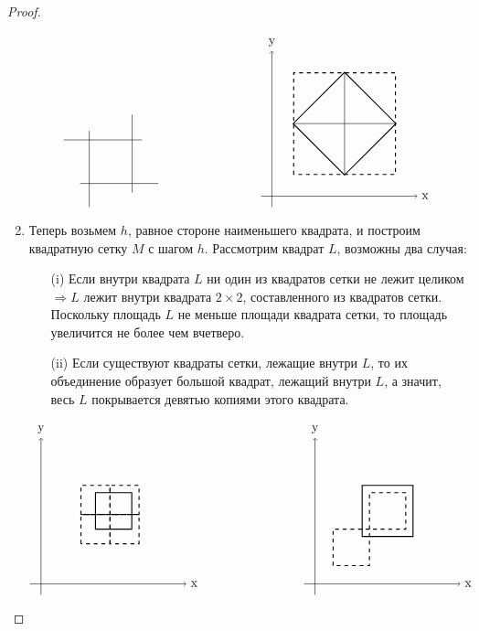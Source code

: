 \begin{proof}
\begin{enumerate}
\[\begin{tikzpicture}
            \draw[-] (0.7, 2.6) -- (2.85, 2.6);
            \draw[-] (1.15, 1.4) -- (3.3, 1.4);
            \draw[-] (1.4, 0.75) -- (1.4, 2.85);
            \draw[-] (2.58, 1.15) -- (2.58, 3.3);
        \end{tikzpicture}
        \tab[80pt]
        \begin{tikzpicture}
            \draw[->] (-0.3, 0) -- (4, 0) node[right] {x};
            \draw[->] (0, -0.3) -- (0, 4) node[above] {y};
            \draw[thick, rotate around={45:(2,2)}] (1, 1) rectangle (3, 3);
            \draw[thick, dashed] (0.6, 0.6) rectangle (3.4, 3.4);
            \draw[-] (2, 0.6) -- (2, 3.4);
            \draw[-] (0.6, 2) -- (3.4, 2);
        \end{tikzpicture}
        \]
        \item Теперь возьмем $h$, равное стороне наименьшего квадрата, и построим квадратную сетку $M$ с шагом $h$. Рассмотрим квадрат $L$, возможны два случая:
        \begin{itemize}
            \item[(i)] Если внутри квадрата $L$ ни один из квадратов сетки не лежит целиком $\Rightarrow L$ лежит внутри квадрата $2\times 2$, составленного из квадратов сетки. Поскольку площадь $L$ не меньше площади квадрата сетки, то площадь увеличится не более чем вчетверо.
            \item[(ii)] Если существуют квадраты сетки, лежащие внутри $L$, то их объединение образует большой квадрат, лежащий внутри $L$, а значит, весь $L$ покрывается девятью копиями этого квадрата.
        \end{itemize}
        \[
        \begin{tikzpicture}
            \draw[->] (-0.3, 0) -- (4, 0) node[right] {x};
            \draw[->] (0, -0.3) -- (0, 4) node[above] {y};
            \draw[thick] (1.5, 1.5) rectangle (2.5, 2.5);
            \draw[thick, dashed] (1.1, 1.1) rectangle (1.9, 1.9);
            \draw[thick, dashed] (1.1, 1.9) rectangle (1.9, 2.7);
            \draw[thick, dashed] (1.9, 1.1) rectangle (2.7, 1.9);
            \draw[thick, dashed] (1.9, 1.9) rectangle (2.7, 2.7);
        \end{tikzpicture}
        \tab[80pt]
        \begin{tikzpicture}
            \draw[->] (-0.3, 0) -- (4, 0) node[right] {x};
            \draw[->] (0, -0.3) -- (0, 4) node[above] {y};
            \draw[thick, dashed] (1.5, 1.5) rectangle (2.5, 2.5);
            \draw[thick] (1.3, 1.3) rectangle (2.7, 2.7);
            \draw[thick, dashed] (0.5, 0.5) rectangle (1.5, 1.5);

\end{tikzpicture}\]
\end{enumerate}
\end{proof}
